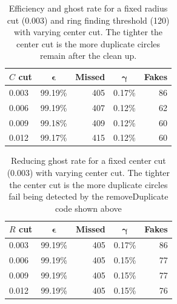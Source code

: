 \documentclass[11pt]{scrreprt}
\begin{document}
\begin{table}[htbp]
  \caption{Efficiency and ghost rate for a fixed radius cut (0.003) and ring finding threshold (120) with varying center cut. The tighter the center cut is
  the more duplicate circles remain after the clean up.}
  \label{tab:cut_variation_1}
  \centering

  \begin{tabular}{lcrcr}
  \toprule
  \textbf{$C$ cut} & $\boldsymbol{\epsilon}$ & \textbf{Missed} & $\boldsymbol{\gamma}$ & \textbf{Fakes} \\
  \midrule
  0.003 & 99.19\% & 405 & 0.17\% & 86 \\
  0.006 & 99.19\% & 407 & 0.12\% & 62 \\
  0.009 & 99.18\% & 409 & 0.12\% & 60 \\
  0.012 & 99.17\% & 415 & 0.12\% & 60 \\
    \bottomrule
  \end{tabular}
\end{table}

\begin{table}[htbp]
  \caption{Reducing ghost rate for a fixed center cut (0.003) with varying center cut. The tighter the center cut is
  the more duplicate circles fail being detected by the removeDuplicate code shown above}
  \label{tab:cut_variation_2}
  \centering

  \begin{tabular}{lcrcr}
  \toprule
  \textbf{$R$ cut} & $\boldsymbol{\epsilon}$ & \textbf{Missed} & $\boldsymbol{\gamma}$ & \textbf{Fakes} \\
  \midrule
  0.003 & 99.19\% & 405 & 0.17\% & 86 \\
  0.006 & 99.19\% & 405 & 0.15\% & 77 \\
  0.009 & 99.19\% & 405 & 0.15\% & 77 \\
  0.012 & 99.19\% & 405 & 0.15\% & 76 \\
  \bottomrule
  \end{tabular}
\end{table}
\end{document}
